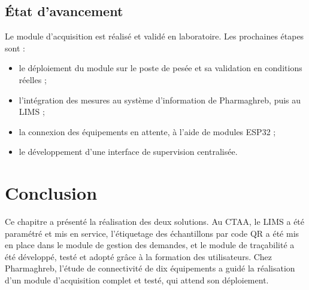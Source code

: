 \subsection{État d'avancement}

Le module d'acquisition est réalisé et validé en laboratoire. Les prochaines étapes sont :
\begin{itemize}
    \item le déploiement du module sur le poste de pesée et sa validation en conditions réelles ;
    \item l'intégration des mesures au système d'information de Pharmaghreb, puis au \ac{LIMS} ;
    \item la connexion des équipements en attente, à l'aide de modules ESP32 ;
    \item le développement d'une interface de supervision centralisée.
\end{itemize}

\section*{Conclusion}

Ce chapitre a présenté la réalisation des deux solutions. Au \ac{CTAA}, le \ac{LIMS} a été paramétré et mis en service, l'étiquetage des échantillons par code \ac{QR} a été mis en place dans le module de gestion des demandes, et le module de traçabilité a été développé, testé et adopté grâce à la formation des utilisateurs. Chez Pharmaghreb, l'étude de connectivité de dix équipements a guidé la réalisation d'un module d'acquisition complet et testé, qui attend son déploiement.
